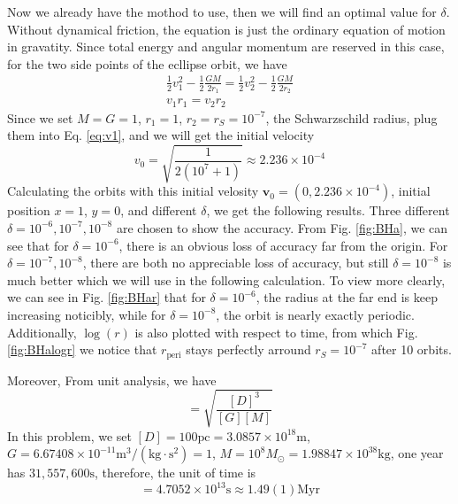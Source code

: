 \documentclass[12pt, graphicx]{article}
\begin{document}
Now we already have the mothod to use, then we will find an optimal value for $\delta$. Without dynamical friction, the equation is just the ordinary equation of motion in gravatity. Since total energy and angular momentum are reserved in this case, for the two side points of the ecllipse orbit, we have
\begin{equation}
\begin{gathered}
\frac{1}{2}v_1^2-\frac{1}{2}\frac{GM}{2r_1}=\frac{1}{2}v_2^2-\frac{1}{2}\frac{GM}{2r_2}\\
v_1r_1=v_2r_2
\end{gathered}
\label{eq:v1}
\end{equation}
Since we set $M=G=1$, $r_1=1$, $r_2=r_S=10^{-7}$, the Schwarzschild radius, plug them into Eq. \ref{eq:v1}, and we will get the initial velocity
\begin{equation}
v_0=\sqrt{\frac{1}{2(10^7+1)}}\approx2.236\times10^{-4}
\end{equation}
Calculating the orbits with this initial velosity $\mathbf{v}_0=(0,2.236\times10^{-4})$, initial position $x=1$, $y=0$, and different $\delta$, we get the following results. Three different $\delta=10^{-6}, 10^{-7}, 10^{-8}$ are chosen to show the accuracy. From Fig. \ref{fig:BHa}, we can see that for $\delta=10^{-6}$, there is an obvious loss of accuracy far from the origin. For $\delta=10^{-7}, 10^{-8}$, there are both no appreciable loss of accuracy, but still $\delta=10^{-8}$ is much better which we will use in the following calculation. To view more clearly, we can see in Fig. \ref{fig:BHar} that for $\delta=10^{-6}$, the radius at the far end is keep increasing noticibly, while for $\delta=10^{-8}$, the orbit is nearly exactly periodic. Additionally, $\log(r)$ is also plotted with respect to time, from which Fig. \ref{fig:BHalogr} we notice that $r_\mathrm{peri}$ stays perfectly arround $r_S=10^{-7}$ after 10 orbits.\par
Moreover, From unit analysis, we have
\begin{equation}
[T]=\sqrt{\frac{[D]^3}{[G][M]}}
\end{equation}
In this problem, we set $[D]=100\mathrm{pc}=3.0857\times10^{18}\mathrm{m}$, $G=6.67408\times10^{-11}\mathrm{m^3/(kg\cdot s^2)}=1$, $M=10^8M_\odot=1.98847\times10^{38}\mathrm{kg}$, one year has $31,557,600\mathrm{s}$, therefore, the unit of time is
\begin{equation}
[T]=4.7052\times10^{13}\mathrm{s}\approx1.49(1)\mathrm{Myr}
\end{equation}
\end{document}
